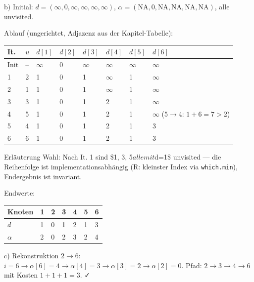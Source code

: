 \documentclass[11pt, a4paper]{article}
\begin{document}
b) Initial: $d=(\infty,0,\infty,\infty,\infty,\infty)$, $\alpha=(\text{NA},0,\text{NA},\text{NA},\text{NA},\text{NA})$, alle unvisited.


Ablauf (ungerichtet, Adjazenz aus der Kapitel-Tabelle):



\begin{landscape}

{\footnotesize
\begin{tabularx}{\linewidth}{XXXXXXXX}
\hline
\rowcolor{tableheadbg}
{\color{white}\textbf{It.}} & {\color{white}\textbf{$u$}} & {\color{white}\textbf{$d[1]$}} & {\color{white}\textbf{$d[2]$}} & {\color{white}\textbf{$d[3]$}} & {\color{white}\textbf{$d[4]$}} & {\color{white}\textbf{$d[5]$}} & {\color{white}\textbf{$d[6]$}} \\[2pt]
\hline
\endhead
\hline
\endfoot
Init & – & $\infty$ & 0 & $\infty$ & $\infty$ & $\infty$ & $\infty$ \\
1 & 2 & 1 & 0 & 1 & $\infty$ & 1 & $\infty$ \\
2 & 1 & 1 & 0 & 1 & $\infty$ & 1 & $\infty$ \\
3 & 3 & 1 & 0 & 1 & 2 & 1 & $\infty$ \\
4 & 5 & 1 & 0 & 1 & 2 & 1 & $\infty$ ($5\to 4$: $1+6=7>2$) \\
5 & 4 & 1 & 0 & 1 & 2 & 1 & 3 \\
6 & 6 & 1 & 0 & 1 & 2 & 1 & 3 \\
\end{tabularx}
}
\end{landscape}


Erläuterung Wahl: Nach It. 1 sind \$1, 3, 5$ alle mit $d=1\$ unvisited — die Reihenfolge ist implementationsabhängig (R: kleinster Index via \texttt{which.min}), Endergebnis ist invariant.


Endwerte:



{\footnotesize
\begin{tabularx}{\linewidth}{XXXXXXX}
\hline
\rowcolor{tableheadbg}
{\color{white}\textbf{Knoten}} & {\color{white}\textbf{1}} & {\color{white}\textbf{2}} & {\color{white}\textbf{3}} & {\color{white}\textbf{4}} & {\color{white}\textbf{5}} & {\color{white}\textbf{6}} \\[2pt]
\hline
\endhead
\hline
\endfoot
$d$ & 1 & 0 & 1 & 2 & 1 & 3 \\
$\alpha$ & 2 & 0 & 2 & 3 & 2 & 4 \\
\end{tabularx}
}


c) Rekonstruktion $2 \to 6$: $i=6 \to \alpha[6]=4 \to \alpha[4]=3 \to \alpha[3]=2 \to \alpha[2]=0$. Pfad: $2 \to 3 \to 4 \to 6$ mit Kosten $1+1+1=3$. ✓





\end{document}
